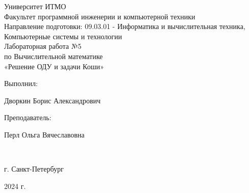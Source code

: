 \begin{center}
\hfill \break
\large{Университет ИТМО}\\
\large{Факультет программной инженерии и компьютерной техники}\\ 
\large{Направление подготовки: 09.03.01 - Информатика и вычислительная техника, Компьютерные системы и технологии}\\ 
\hfill\break
\hfill \break
\hfill \break
\hfill \break
\hfill \break
\hfill \break
\hfill \break
\hfill \break
\large{Лабораторная работа №5\\по Вычислительной математике\\«Решение ОДУ и задачи Коши»}\\
\hfill \break
\hfill \break
\hfill \break
\hfill \break
\hfill \break
\end{center}
\hfill \break
\normalsize{ 
\begin{flushright}
Выполнил:
\par
Дворкин Борис Александрович
\par
Преподаватель:
\par
Перл Ольга Вячеславовна
\end{flushright}
}\\
\hfill \break
\hfill \break
\hfill \break
\hfill \break
\begin{center} г. Санкт-Петербург 
\par
2024 г. 
\end{center}
\thispagestyle{empty}
\thispagestyle{empty}
\thispagestyle{empty}